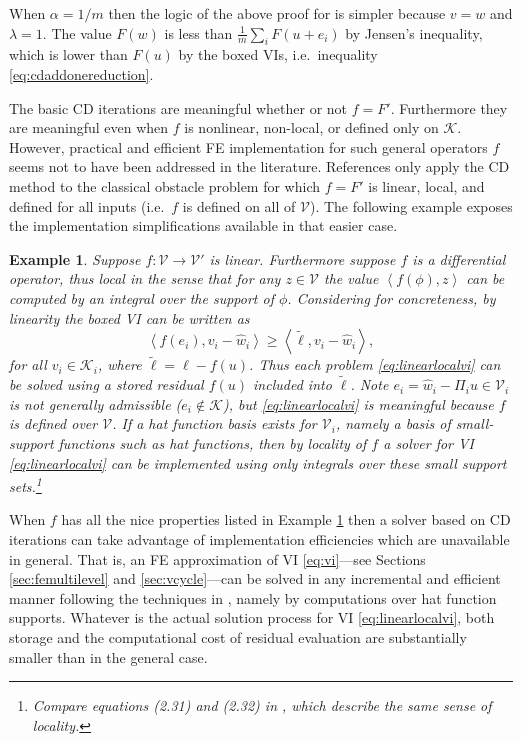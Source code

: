 \documentclass[letterpaper,final,12pt,reqno]{amsart}
\theoremstyle{cstyle}
\theoremstyle{cstyle*}
\theoremstyle{dstyle}
\newtheorem{example}[theorem]{Example}
\numberwithin{equation}{section}
\numberwithin{figure}{section}
\numberwithin{table}{section}
\numberwithin{theorem}{section}
\newcommand{\cK}{\mathcal{K}}
\newcommand{\cV}{\mathcal{V}}
\newcommand{\ip}[2]{\left<#1,#2\right>}
\begin{document}
When $\alpha=1/m$ then the logic of the above proof for  is simpler because $v=w$ and $\lambda=1$.  The value $F(w)$ is less than $\frac{1}{m} \sum_i F(u+e_i)$ by Jensen's inequality, which is lower than $F(u)$ by the boxed VIs, i.e.~inequality \eqref{eq:cdaddonereduction}.

The basic CD iterations are meaningful whether or not $f=F'$.  Furthermore they are meaningful even when $f$ is nonlinear, non-local, or defined only on $\cK$.  However, practical and efficient FE implementation for such general operators $f$ seems not to have been addressed in the literature.  References \cite{GraeserKornhuber2009,Tai2003} only apply the CD method to the classical obstacle problem for which $f=F'$ is linear, local, and defined for all inputs (i.e.~$f$ is defined on all of $\mathcal{V}$).  The following example exposes the implementation simplifications available in that easier case.

\begin{example}  \label{ex:fnice} Suppose $f:\cV \to \cV'$ is linear.  Furthermore suppose $f$ is a differential operator, thus local in the sense that for any $z\in\mathcal{V}$ the value $\ip{f(\phi)}{z}$ can be computed by an integral over the support of $\phi$.  Considering  for concreteness, by linearity the boxed VI can be written as
\begin{equation}
\ip{f(e_i)}{v_i-\hat w_i} \ge \ip{\tilde\ell}{v_i-\hat w_i}, \label{eq:linearlocalvi}
\end{equation}
for all $v_i \in \mathcal{K}_i$, where $\tilde\ell = \ell - f(u)$.  Thus each problem \eqref{eq:linearlocalvi} can be solved using a stored residual $f(u)$ included into $\tilde\ell$.  Note $e_i = \hat w_i - \Pi_i u \in \cV_i$ is not generally admissible ($e_i \notin \cK$), but \eqref{eq:linearlocalvi} is meaningful because $f$ is defined over $\cV$.  If a hat function basis exists for $\cV_i$, namely a basis of small-support functions such as hat functions, then by locality of $f$ a solver for VI \eqref{eq:linearlocalvi} can be implemented using only integrals over these small support sets.\footnote{Compare equations (2.31) and (2.32) in \cite{Farrelletal2021}, which describe the same sense of locality.}
\end{example}

When $f$ has all the nice properties listed in Example \ref{ex:fnice} then a solver based on CD iterations can take advantage of implementation efficiencies which are unavailable in general.  That is, an FE approximation of VI \eqref{eq:vi}---see Sections \ref{sec:femultilevel} and \ref{sec:vcycle}---can be solved in any incremental and efficient manner following the techniques in \cite{GraeserKornhuber2009,Tai2003}, namely by computations over hat function supports.  Whatever is the actual solution process for VI \eqref{eq:linearlocalvi}, both storage and the computational cost of residual evaluation are substantially smaller than in the general case.
\end{document}
